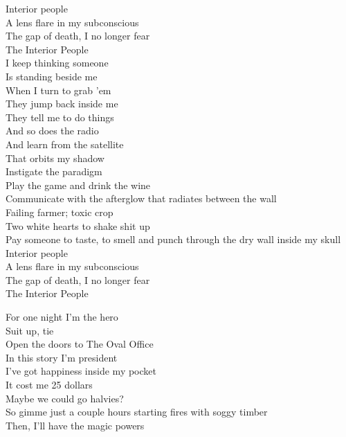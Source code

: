 Interior people \\
A lens flare in my subconscious \\
The gap of death, I no longer fear \\
The Interior People \\

I keep thinking someone \\
Is standing beside me \\
When I turn to grab 'em \\
They jump back inside me \\
They tell me to do things \\
And so does the radio \\
And learn from the satellite \\
That orbits my shadow \\

Instigate the paradigm \\
Play the game and drink the wine \\
Communicate with the afterglow that radiates between the wall \\

Failing farmer; toxic crop \\
Two white hearts to shake shit up \\
Pay someone to taste, to smell and punch through the dry wall inside my skull \\

Interior people \\
A lens flare in my subconscious \\
The gap of death, I no longer fear \\
The Interior People \\




For one night I'm the hero \\
Suit up, tie \\
Open the doors to The Oval Office \\
In this story I'm president \\

I've got happiness inside my pocket \\
It cost me 25 dollars \\
Maybe we could go halvies? \\
So gimme just a couple hours starting fires with soggy timber \\
Then, I'll have the magic powers \\

